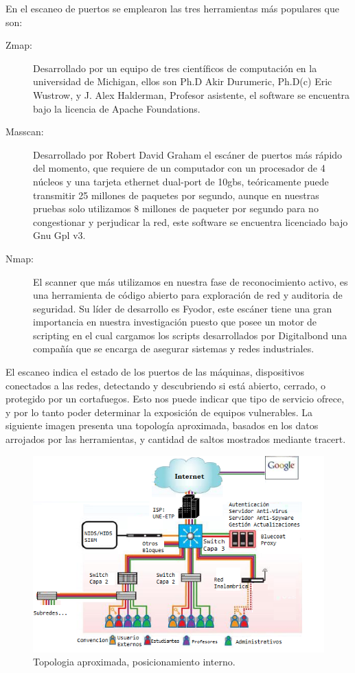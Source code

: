 \documentclass[jou]{apa6}   %
\begin{document}
En el escaneo de puertos se emplearon las tres herramientas más populares que son:
\begin{description}
\item [Zmap:] Desarrollado por un equipo de tres científicos de computación en la universidad de Michigan, ellos son Ph.D  Akir Durumeric, Ph.D(c) Eric Wustrow, y J. Alex Halderman, Profesor asistente, el software se encuentra bajo la licencia de Apache Foundations.
\item [Masscan:] Desarrollado por Robert David Graham el escáner de puertos más rápido del momento, que requiere de un computador con un procesador de 4 núcleos y una tarjeta ethernet dual-port de 10gbs, teóricamente puede transmitir 25 millones de paquetes por segundo, aunque en nuestras pruebas solo utilizamos 8 millones de paqueter por segundo para no congestionar y perjudicar la red, este software se encuentra licenciado bajo Gnu Gpl v3.
\item [Nmap:] El scanner que más utilizamos en nuestra fase de reconocimiento activo,  es una herramienta de código abierto para exploración de red y auditoria de seguridad. Su líder de desarrollo es Fyodor, este escáner tiene una gran importancia en nuestra investigación puesto que posee un motor de scripting en el cual cargamos los scripts desarrollados por Digitalbond una compañía que se encarga de asegurar sistemas y redes industriales.
\end{description}
El escaneo indica el estado de los puertos de las máquinas, dispositivos conectados a las redes, detectando y descubriendo si está abierto, cerrado, o protegido por un  cortafuegos. Esto nos puede indicar que tipo de servicio ofrece, y por lo tanto poder determinar la exposición de equipos vulnerables. La siguiente imagen presenta una topología aproximada, basados en los datos arrojados por las herramientas, y cantidad de saltos mostrados mediante tracert.
\begin{figure}[htb]
\centering
\includegraphics[scale=0.6]{images/topologia.png}
\caption{Topologia aproximada, posicionamiento interno.} \label{fig:topologiared}
\end{figure}
\end{document}
